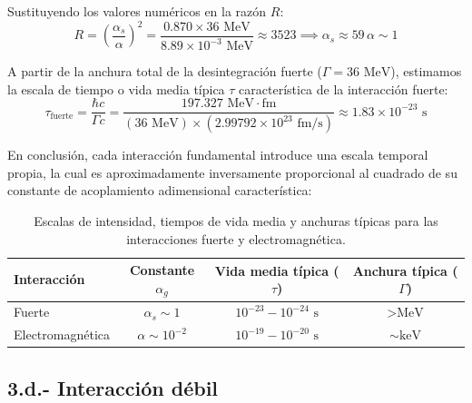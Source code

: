 Sustituyendo los valores numéricos en la razón $R$:
\begin{equation}
    R = \left( \frac{\alpha_s}{\alpha} \right)^2 = \frac{0.870 \times 36 \text{ MeV}}{8.89 \times 10^{-3} \text{ MeV}} \approx 3523 \implies \alpha_s \approx 59 \, \alpha \sim 1
\end{equation}

A partir de la anchura total de la desintegración fuerte ($\Gamma = 36 \text{ MeV}$), estimamos la escala de tiempo o vida media típica $\tau$ característica de la interacción fuerte:
\begin{equation}
    \tau_{\text{fuerte}} = \frac{\hbar c}{\Gamma c} = \frac{197.327 \text{ MeV}\cdot\text{fm}}{(36 \text{ MeV}) \times (2.99792 \times 10^{23} \text{ fm/s})} \approx 1.83 \times 10^{-23} \text{ s}
\end{equation}

\newpage
En conclusión, cada interacción fundamental introduce una escala temporal propia, la cual es aproximadamente inversamente proporcional al cuadrado de su constante de acoplamiento adimensional característica:

\begin{table}[htbp]
    \centering
    \caption{Escalas de intensidad, tiempos de vida media y anchuras típicas para las interacciones fuerte y electromagnética.}
    \label{tab:interacciones_tiempos}
    \begin{tabular}{lccc}
        \toprule
        \textbf{Interacción} & \textbf{Constante $\alpha_g$} & \textbf{Vida media típica ($\tau$)} & \textbf{Anchura típica ($\Gamma$)} \\
        \midrule
        Fuerte & $\alpha_s \sim 1$ & $10^{-23} - 10^{-24} \text{ s}$ & $> \text{MeV}$ \\
        Electromagnética & $\alpha \sim 10^{-2}$ & $10^{-19} - 10^{-20} \text{ s}$ & $\sim \text{keV}$ \\
        \bottomrule
    \end{tabular}
\end{table}

\newpage

\subsection{3.d.- Interacción débil}

